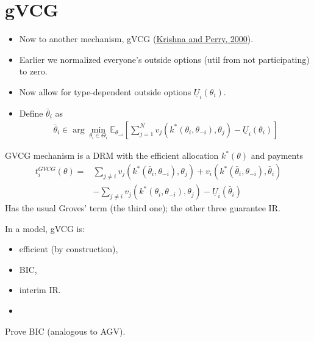 \documentclass[english,handout,10pt]{beamer}		%
\def\lyxframeend{} %
\begin{document}
\section{gVCG}

\begin{itemize}
	\item Now to another mechanism, gVCG (\href{https://sites.google.com/site/vjkrishna/research}{Krishna and Perry, 2000}).
	\item Earlier we normalized everyone's outside options (util from not participating) to zero.
	\item Now allow for type-dependent outside options $\underline{U}_i (\theta_i)$.
	\pause\medskip
	\item Define  $\bar{\theta}_i$ as
	\begin{align*}
	\bar{\theta}_i \in \arg \min_{\theta_i \in \Theta_i} \mathbb{E}_{\theta_{-i}} \left[ \sum_{j=1}^{N} v_j (k^*(\theta_i,\theta_{-i}),\theta_j) - \underline{U}_i (\theta_i) \right]
	\end{align*}
\end{itemize}
\lyxframeend


GVCG mechanism is a DRM with the efficient allocation $k^*(\theta)$ and payments
\begin{align*}
t_i^{GVCG} (\theta) =& \sum_{j \neq i} v_j (k^*(\bar{\theta}_i,\theta_{-i}),\theta_j) + v_i (k^*(\bar{\theta}_i,\theta_{-i}),\bar{\theta}_i)
\\& - \sum_{j \neq i} v_j (k^*(\theta_i,\theta_{-i}),\theta_j) - \underline{U}_i (\bar{\theta}_i)
\end{align*}
\pause
Has the usual Groves' term (the third one); the other three guarantee IR.
\lyxframeend


\begin{theorem}
	In a  model, gVCG is:
	\begin{itemize}
		\item efficient (by construction),
		\item BIC,
		\item interim IR.
		\item %
	\end{itemize}
\end{theorem}
Prove BIC (analogous to AGV).
\lyxframeend
\end{document}

